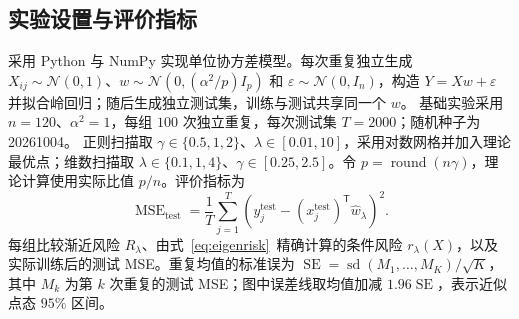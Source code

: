 \documentclass[UTF8,fontset=fandol,a4paper,zihao=-4]{ctexart}
\newcommand{\whw}{\widehat w}
\begin{document}
\subsection{实验设置与评价指标}
采用 Python 与 NumPy 实现单位协方差模型。每次重复独立生成 $X_{ij}\sim\mathcal N(0,1)$、$w\sim\mathcal N(0,(\alpha^2/p)I_p)$ 和 $\varepsilon\sim\mathcal N(0,I_n)$，构造 $Y=Xw+\varepsilon$ 并拟合岭回归；随后生成独立测试集，训练与测试共享同一个 $w$。
基础实验采用 $n=120$、$\alpha^2=1$，每组 $100$ 次独立重复，每次测试集 $T=2000$；随机种子为 20261004。
正则扫描取 $\gamma\in\{0.5,1,2\}$、$\lambda\in[0.01,10]$，采用对数网格并加入理论最优点；维数扫描取 $\lambda\in\{0.1,1,4\}$、$\gamma\in[0.25,2.5]$。令 $p=\operatorname{round}(n\gamma)$，理论计算使用实际比值 $p/n$。评价指标为
\begin{equation}\label{eq:mse}
\operatorname{MSE}_{\mathrm{test}}=\frac{1}{T}\sum_{j=1}^{T}\left(y_j^{\mathrm{test}}-(x_j^{\mathrm{test}})^{\mathsf T}\whw_\lambda\right)^2.
\end{equation}
每组比较渐近风险 $R_\lambda$、由式~\eqref{eq:eigenrisk}~精确计算的条件风险 $r_\lambda(X)$，以及实际训练后的测试 MSE。重复均值的标准误为 $\operatorname{SE}=\operatorname{sd}(M_1,\ldots,M_K)/\sqrt K$，其中 $M_k$ 为第 $k$ 次重复的测试 MSE；图中误差线取均值加减 $1.96\operatorname{SE}$，表示近似点态 $95\%$ 区间。
\end{document}
